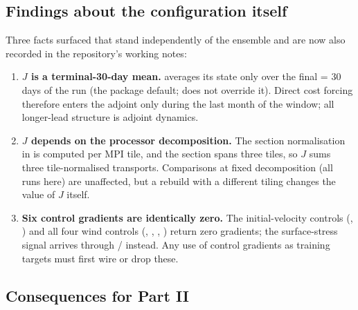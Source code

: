 \subsection{Findings about the configuration itself}
\label{sec:results-config}

Three facts surfaced that stand independently of the ensemble and are now also
recorded in the repository's working notes:

\begin{enumerate}[nosep]
  \item \textbf{$J$ is a terminal-30-day mean.}  averages its
        state only over the final  = 30 days of the run
        (the package default;  does not override it). Direct
        cost forcing therefore enters the adjoint only during the last month
        of the window; all longer-lead structure is adjoint dynamics.
  \item \textbf{$J$ depends on the processor decomposition.} The section
        normalisation in  is computed per MPI
        tile, and the section spans three tiles, so $J$ sums three
        tile-normalised transports. Comparisons at fixed decomposition (all
        runs here) are unaffected, but a rebuild with a different tiling
        changes the value of $J$ itself.
  \item \textbf{Six control gradients are identically zero.} The
        initial-velocity controls (, ) and all
        four wind controls (, , ,
        ) return zero gradients; the surface-stress signal arrives
        through / instead. Any use of control
        gradients as training targets must first wire or drop these.
\end{enumerate}

\subsection{Consequences for Part II}
\label{sec:results-part2}

